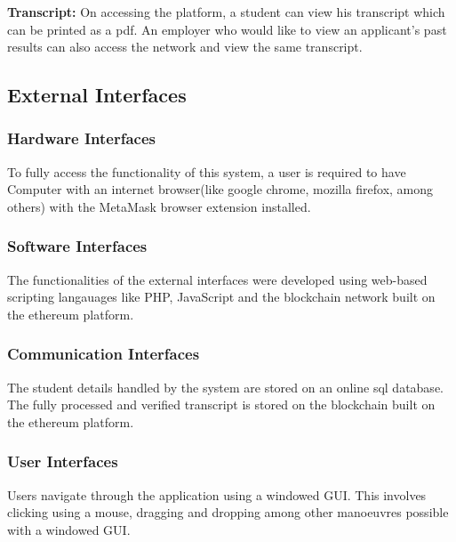 \textbf{Transcript:} On accessing the platform, a student can view his transcript which can be printed as a pdf. An employer who would like to view an applicant’s past results can also access the network and view the same transcript.\\

\subsection{External Interfaces}

\subsubsection{Hardware Interfaces}
To fully access the functionality of this system, a user is required to have Computer with an internet browser(like google chrome, mozilla firefox, among others) with the MetaMask browser extension installed. 

\subsubsection{Software Interfaces}
The functionalities of the external interfaces were developed using web-based scripting langauages like PHP, JavaScript and the blockchain network built on the ethereum platform.

\subsubsection{Communication Interfaces}
The student details handled by the system are stored on an online sql database. The fully processed and verified transcript is stored on the blockchain built on the ethereum platform.

\subsubsection{User Interfaces}
Users navigate through the application using a windowed GUI. This involves clicking using a mouse, dragging and dropping among other manoeuvres possible with a windowed GUI.